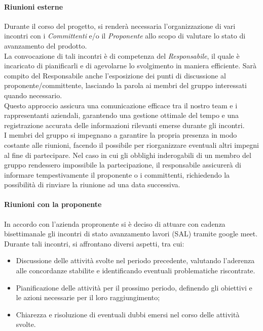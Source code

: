 \documentclass{article}
\begin{document}
\paragraph{Riunioni esterne}
Durante il corso del progetto, si renderà necessaria l'organizzazione di vari incontri con i \textit{Committenti} e/o il \textit{Proponente} allo scopo di valutare lo stato di avanzamento del prodotto.\\
La convocazione di tali incontri è di competenza del \textit{Responsabile}, il quale è incaricato di pianificarli e di agevolarne lo svolgimento in maniera efficiente. Sarà compito del Responsabile anche l'esposizione dei punti di discussione al proponente/committente, lasciando la parola ai membri del gruppo interessati quando necessario.
\\
Questo approccio assicura una comunicazione efficace tra il nostro team e i rappresentanti aziendali, garantendo una gestione ottimale del tempo e una registrazione accurata delle informazioni rilevanti emerse durante gli incontri.\\
I membri del gruppo si impegnano a garantire la propria presenza in modo costante alle riunioni, facendo il possibile per riorganizzare eventuali altri impegni al fine di partecipare. Nel caso in cui gli obblighi inderogabili di un membro del gruppo rendessero impossibile la partecipazione, il responsabile assicurerà di informare tempestivamente il proponente o i committenti, richiedendo la possibilità di rinviare la riunione ad una data successiva.

\paragraph*{Riunioni con la proponente}
In accordo con l'azienda propronente si è deciso di attuare con cadenza bisettimanale gli incontri di stato avanzamento lavori (SAL) tramite google meet.\\
Durante tali incontri, si affrontano diversi aspetti, tra cui:
\begin{itemize}
    \item Discussione delle attività svolte nel periodo precedente, valutando l'aderenza alle concordanze stabilite e identificando eventuali problematiche riscontrate.
    \item Pianificazione delle attività per il prossimo periodo, definendo gli obiettivi e le azioni necessarie per il loro raggiungimento;
    \item Chiarezza e risoluzione di eventuali dubbi emersi nel corso delle attività svolte.
\end{itemize}
\end{document}
